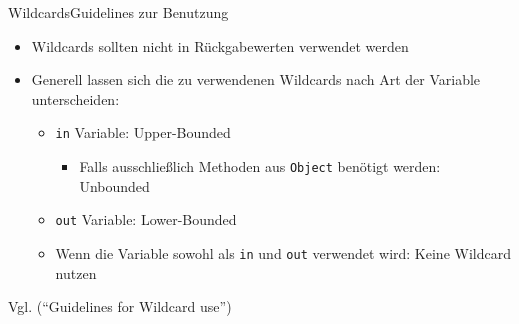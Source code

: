 \begin{frame}{Wildcards}{Guidelines zur Benutzung}
\begin{itemize}
    \item Wildcards sollten nicht in Rückgabewerten verwendet werden
    \item Generell lassen sich die zu verwendenen Wildcards nach Art der Variable unterscheiden:
    \begin{itemize}
        \item \texttt{in} Variable: Upper-Bounded
        \begin{itemize}
            \item Falls ausschließlich Methoden aus \texttt{Object} benötigt werden: Unbounded
        \end{itemize}
        \item \texttt{out} Variable: Lower-Bounded
        \item Wenn die Variable sowohl als \texttt{in} und \texttt{out} verwendet wird: Keine Wildcard nutzen
    \end{itemize}
\end{itemize}

Vgl. \cite{orac:wildcard}("`Guidelines for Wildcard use"')
\end{frame}